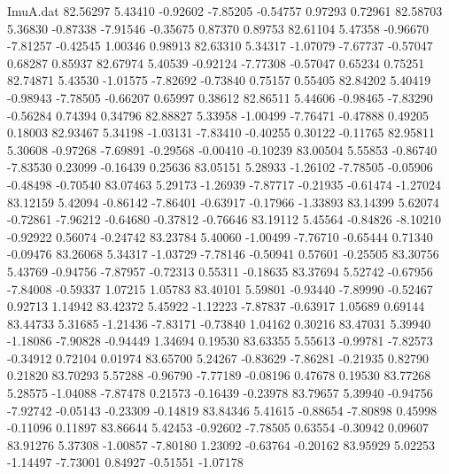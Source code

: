 \begin{filecontents}{ImuA.dat}
  82.56297    5.43410   -0.92602   -7.85205   -0.54757    0.97293    0.72961
  82.58703    5.36830   -0.87338   -7.91546   -0.35675    0.87370    0.89753
  82.61104    5.47358   -0.96670   -7.81257   -0.42545    1.00346    0.98913
  82.63310    5.34317   -1.07079   -7.67737   -0.57047    0.68287    0.85937
  82.67974    5.40539   -0.92124   -7.77308   -0.57047    0.65234    0.75251
  82.74871    5.43530   -1.01575   -7.82692   -0.73840    0.75157    0.55405
  82.84202    5.40419   -0.98943   -7.78505   -0.66207    0.65997    0.38612
  82.86511    5.44606   -0.98465   -7.83290   -0.56284    0.74394    0.34796
  82.88827    5.33958   -1.00499   -7.76471   -0.47888    0.49205    0.18003
  82.93467    5.34198   -1.03131   -7.83410   -0.40255    0.30122   -0.11765
  82.95811    5.30608   -0.97268   -7.69891   -0.29568   -0.00410   -0.10239
  83.00504    5.55853   -0.86740   -7.83530    0.23099   -0.16439    0.25636
  83.05151    5.28933   -1.26102   -7.78505   -0.05906   -0.48498   -0.70540
  83.07463    5.29173   -1.26939   -7.87717   -0.21935   -0.61474   -1.27024
  83.12159    5.42094   -0.86142   -7.86401   -0.63917   -0.17966   -1.33893
  83.14399    5.62074   -0.72861   -7.96212   -0.64680   -0.37812   -0.76646
  83.19112    5.45564   -0.84826   -8.10210   -0.92922    0.56074   -0.24742
  83.23784    5.40060   -1.00499   -7.76710   -0.65444    0.71340   -0.09476
  83.26068    5.34317   -1.03729   -7.78146   -0.50941    0.57601   -0.25505
  83.30756    5.43769   -0.94756   -7.87957   -0.72313    0.55311   -0.18635
  83.37694    5.52742   -0.67956   -7.84008   -0.59337    1.07215    1.05783
  83.40101    5.59801   -0.93440   -7.89990   -0.52467    0.92713    1.14942
  83.42372    5.45922   -1.12223   -7.87837   -0.63917    1.05689    0.69144
  83.44733    5.31685   -1.21436   -7.83171   -0.73840    1.04162    0.30216
  83.47031    5.39940   -1.18086   -7.90828   -0.94449    1.34694    0.19530
  83.63355    5.55613   -0.99781   -7.82573   -0.34912    0.72104    0.01974
  83.65700    5.24267   -0.83629   -7.86281   -0.21935    0.82790    0.21820
  83.70293    5.57288   -0.96790   -7.77189   -0.08196    0.47678    0.19530
  83.77268    5.28575   -1.04088   -7.87478    0.21573   -0.16439   -0.23978
  83.79657    5.39940   -0.94756   -7.92742   -0.05143   -0.23309   -0.14819
  83.84346    5.41615   -0.88654   -7.80898    0.45998   -0.11096    0.11897
  83.86644    5.42453   -0.92602   -7.78505    0.63554   -0.30942    0.09607
  83.91276    5.37308   -1.00857   -7.80180    1.23092   -0.63764   -0.20162
  83.95929    5.02253   -1.14497   -7.73001    0.84927   -0.51551   -1.07178

\end{filecontents}
